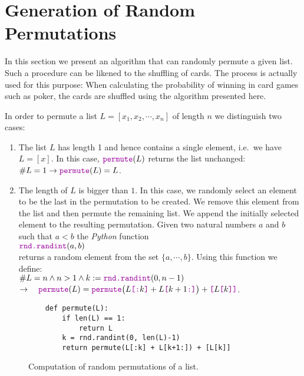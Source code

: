 \section[Permutations]{Generation of Random Permutations}
In this section we present an algorithm that can randomly permute a given list.
Such a procedure can be likened to the shuffling of cards. The process is actually used for this purpose: When
calculating the probability of winning in card games such as poker, the cards are shuffled using the algorithm
presented here. 

In order to permute a list $L = [x_1,x_2, \cdots, x_n]$ of length $n$ we distinguish two cases:
\begin{enumerate}
\item The list  $L$ has length 1 and hence contains a single element, i.e.~we have $L = [x]$.
      In this case,  $\mytt{permute}(L)$ returns the list unchanged:
      \\[0.2cm]
      \hspace*{1.3cm}
      $\#L = 1 \rightarrow \mytt{permute}(L) = L$.
\item The length of  $L$ is bigger than  $1$.  In this case, we randomly select an element to be the last in
      the permutation to be created.  We remove this element from the list and then permute the remaining list.  
      We append the initially selected element to the resulting permutation.
      Given two natural numbers $a$ and $b$ such that $a < b$ the \textsl{Python} function
      \\[0.2cm]
      \hspace*{1.3cm}
      $\mytt{rnd.randint}(a,b)$
      \\[0.2cm]
      returns a random element from the set $\{a,\cdots,b\}$.  Using this function we define:
      \\[0.2cm]
      \hspace*{0.8cm}
      $\#L = n \wedge n > 1 \wedge k :=\mytt{rnd.randint}(0,n-1) $
      \\[0.2cm]
      \hspace*{2.3cm}
      $\rightarrow\quad  
         \mytt{permute}(L) = \mytt{permute}\bigl(L\mytt{[:}k\mytt{]} + L\mytt{[}k+1\mytt{:]}\bigr) + \mytt{[}L\mytt{[}k\mytt{]]}
      $.
\end{enumerate}

\begin{figure}[!ht]
\centering
\begin{verbatim}
    def permute(L):
        if len(L) == 1:
            return L
        k = rnd.randint(0, len(L)-1)
        return permute(L[:k] + L[k+1:]) + [L[k]]
\end{verbatim}
\vspace*{-0.3cm}
\caption{Computation of random permutations of a list.}
\label{fig:Permutation.ipynb}
\end{figure}

